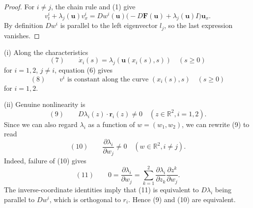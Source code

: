 \begin{proof}
\sketch For $i\ne j$, the chain rule and (1) give
\[
v^i_t+\lambda_j(\mathbf u)v^i_x
=Dw^i(\mathbf u)\bigl(-D\mathbf F(\mathbf u)+\lambda_j(\mathbf u)I\bigr)\mathbf u_x.
\]
By definition $Dw^i$ is parallel to the left eigenvector $l_j$, so the last expression vanishes.
\end{proof}

\begin{remark}
\label{rem:riemann-invariant-characteristic-curves}
(i) Along the characteristics
$$(7) \qquad \dot x_i(s) = \lambda_j(\mathbf{u}(x_i(s),s)) \quad (s\geq 0)$$
for $i=1,2$, $j\neq i$, equation (6) gives
$$(8) \qquad v^i \text{ is constant along the curve } (x_i(s),s) \quad (s\geq 0)$$
for $i=1,2$.

(ii) Genuine nonlinearity is
$$(9) \qquad D\lambda_i(z)\cdot\mathbf{r}_i(z) \neq 0 \quad (z\in\mathbb{R}^2, i=1,2).$$
Since we can also regard $\lambda_i$ as a function of $w=(w_1,w_2)$, we can rewrite (9) to read
$$(10) \qquad \frac{\partial\lambda_i}{\partial w_j} \neq 0 \quad (w\in\mathbb{R}^2, i\neq j).$$
Indeed, failure of (10) gives
$$(11) \qquad 0 = \frac{\partial\lambda_i}{\partial w_j} = \sum_{k=1}^2 \frac{\partial\lambda_i}{\partial z_k}\frac{\partial z^k}{\partial w_j}.$$
The inverse-coordinate identities imply that (11) is equivalent to $D\lambda_i$ being parallel to $Dw^i$, which is orthogonal to $r_i$. Hence (9) and (10) are equivalent.
\end{remark}

